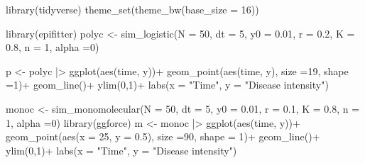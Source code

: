 \documentclass[
  letterpaper,
  DIV=11,
  numbers=noendperiod]{scrreprt}
\newenvironment{Shaded}{\begin{snugshade}}{\end{snugshade}}
\newcommand{\AttributeTok}[1]{\textcolor[rgb]{0.40,0.45,0.13}{#1}}
\newcommand{\DecValTok}[1]{\textcolor[rgb]{0.68,0.00,0.00}{#1}}
\newcommand{\FloatTok}[1]{\textcolor[rgb]{0.68,0.00,0.00}{#1}}
\newcommand{\FunctionTok}[1]{\textcolor[rgb]{0.28,0.35,0.67}{#1}}
\newcommand{\NormalTok}[1]{\textcolor[rgb]{0.00,0.23,0.31}{#1}}
\newcommand{\OtherTok}[1]{\textcolor[rgb]{0.00,0.23,0.31}{#1}}
\newcommand{\SpecialCharTok}[1]{\textcolor[rgb]{0.37,0.37,0.37}{#1}}
\newcommand{\StringTok}[1]{\textcolor[rgb]{0.13,0.47,0.30}{#1}}
\begin{document}
\begin{Shaded}
\begin{Highlighting}[]
\FunctionTok{library}\NormalTok{(tidyverse)}
\FunctionTok{theme\_set}\NormalTok{(}\FunctionTok{theme\_bw}\NormalTok{(}\AttributeTok{base\_size =} \DecValTok{16}\NormalTok{))}

\FunctionTok{library}\NormalTok{(epifitter)}
\NormalTok{polyc }\OtherTok{\textless{}{-}} \FunctionTok{sim\_logistic}\NormalTok{(}\AttributeTok{N =} \DecValTok{50}\NormalTok{, }\AttributeTok{dt =} \DecValTok{5}\NormalTok{, }
                      \AttributeTok{y0 =} \FloatTok{0.01}\NormalTok{, }\AttributeTok{r =} \FloatTok{0.2}\NormalTok{, }
                      \AttributeTok{K =} \FloatTok{0.8}\NormalTok{, }\AttributeTok{n =} \DecValTok{1}\NormalTok{, }
                      \AttributeTok{alpha =}\DecValTok{0}\NormalTok{)}

\NormalTok{p }\OtherTok{\textless{}{-}}\NormalTok{ polyc }\SpecialCharTok{|\textgreater{}} 
  \FunctionTok{ggplot}\NormalTok{(}\FunctionTok{aes}\NormalTok{(time, y))}\SpecialCharTok{+}
  \FunctionTok{geom\_point}\NormalTok{(}\FunctionTok{aes}\NormalTok{(time, y), }\AttributeTok{size =}\DecValTok{19}\NormalTok{, }\AttributeTok{shape =}\DecValTok{1}\NormalTok{)}\SpecialCharTok{+}
  \FunctionTok{geom\_line}\NormalTok{()}\SpecialCharTok{+}
  \FunctionTok{ylim}\NormalTok{(}\DecValTok{0}\NormalTok{,}\DecValTok{1}\NormalTok{)}\SpecialCharTok{+}
  \FunctionTok{labs}\NormalTok{(}\AttributeTok{x =} \StringTok{"Time"}\NormalTok{, }\AttributeTok{y =} \StringTok{"Disease intensity"}\NormalTok{)}


\NormalTok{monoc }\OtherTok{\textless{}{-}} \FunctionTok{sim\_monomolecular}\NormalTok{(}\AttributeTok{N =} \DecValTok{50}\NormalTok{, }\AttributeTok{dt =} \DecValTok{5}\NormalTok{, }
                           \AttributeTok{y0 =} \FloatTok{0.01}\NormalTok{, }\AttributeTok{r =} \FloatTok{0.1}\NormalTok{,}
                           \AttributeTok{K =} \FloatTok{0.8}\NormalTok{, }\AttributeTok{n =} \DecValTok{1}\NormalTok{, }
                           \AttributeTok{alpha =}\DecValTok{0}\NormalTok{)}
\FunctionTok{library}\NormalTok{(ggforce)}
\NormalTok{m }\OtherTok{\textless{}{-}}\NormalTok{ monoc }\SpecialCharTok{|\textgreater{}} 
  \FunctionTok{ggplot}\NormalTok{(}\FunctionTok{aes}\NormalTok{(time, y))}\SpecialCharTok{+}
  \FunctionTok{geom\_point}\NormalTok{(}\FunctionTok{aes}\NormalTok{(}\AttributeTok{x =} \DecValTok{25}\NormalTok{, }\AttributeTok{y =} \FloatTok{0.5}\NormalTok{), }\AttributeTok{size =}\DecValTok{90}\NormalTok{, }\AttributeTok{shape =} \DecValTok{1}\NormalTok{)}\SpecialCharTok{+}
   \FunctionTok{geom\_line}\NormalTok{()}\SpecialCharTok{+}
  \FunctionTok{ylim}\NormalTok{(}\DecValTok{0}\NormalTok{,}\DecValTok{1}\NormalTok{)}\SpecialCharTok{+}
  \FunctionTok{labs}\NormalTok{(}\AttributeTok{x =} \StringTok{"Time"}\NormalTok{, }\AttributeTok{y =} \StringTok{"Disease intensity"}\NormalTok{)}


\end{Highlighting}
\end{Shaded}
\end{document}
